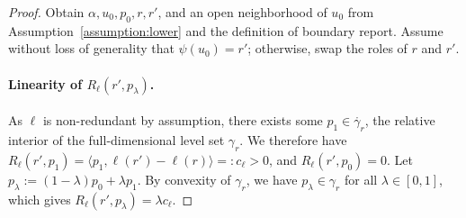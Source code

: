 \documentclass{article}
\theoremstyle{definition}\newtheorem{definition}{Definition}
\theoremstyle{definition}\newtheorem{assumption}{Assumption}
\newcommand{\inprod}[2]{\langle #1, #2 \rangle}%
\newcommand{\inter}[1]{\mathring{#1}}%
\begin{document}
\begin{proof}
  Obtain $\alpha, u_0, p_0, r, r'$, and an open neighborhood of $u_0$ from Assumption~\ref{assumption:lower} and the definition of boundary report.
  Assume without loss of generality that $\psi(u_0) = r'$; otherwise, swap the roles of $r$ and $r'$.

  \paragraph{Linearity of $R_{\ell}(r',p_{\lambda})$.}
  As $\ell$ is non-redundant by assumption, there exists some $p_1 \in \inter{\gamma_r}$, the relative interior of the full-dimensional level set $\gamma_r$.
  We therefore have $R_\ell(r',p_1) = \inprod{p_1}{\ell(r')-\ell(r)} =: c_\ell > 0$, and $R_\ell(r',p_0) = 0$.
  Let $p_\lambda := (1-\lambda) p_0 + \lambda p_1$.
  By convexity of $\gamma_r$, we have $p_\lambda \in \gamma_r$ for all $\lambda \in [0,1]$, which gives $R_\ell(r',p_\lambda) = \lambda c_\ell$.


\end{proof}
\end{document}
